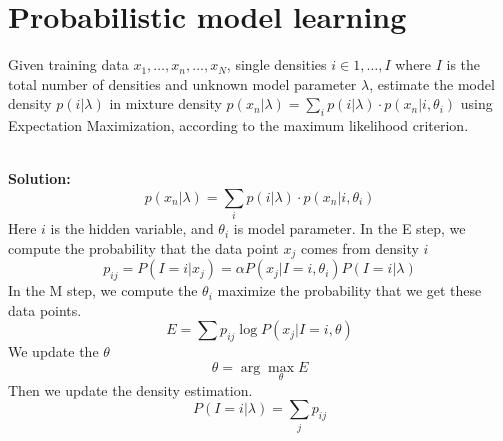 
\section{Probabilistic model learning}

Given training data $x_1,\dots,x_n,\dots,x_N$, single densities $i\in 1,\dots, I$ where $I$ is the total number of densities and unknown model parameter $\lambda$, estimate the model density $p(i|\lambda)$ in mixture density $p(x_n|\lambda)=\sum_i p(i|\lambda) \cdot p(x_n|i,\theta_i)$ using Expectation Maximization, according to the maximum likelihood criterion.

\ \\{\bf Solution:} 
\[
p(x_n|\lambda)=\sum_i p(i|\lambda) \cdot p(x_n|i,\theta_i)
\]
Here $i$ is the hidden variable, and $\theta_i$ is model parameter. In the E step, we compute the probability that the data point $x_j$ comes from density $i$
\[
p_{ij} = P(I=i|x_j) = \alpha P(x_j|I=i, \theta_i) P(I=i|\lambda)
\]
In the M step, we compute the $\theta_i$ maximize the probability that we get these data points.
\[
E = \sum p_{ij} \log P(x_j|I=i, \theta)
\]
We update the $\theta$
\[
\theta = \arg\max_{\theta} E
\]
Then we update the density estimation.
\[
P(I=i|\lambda) = \sum_j p_{ij}
\]